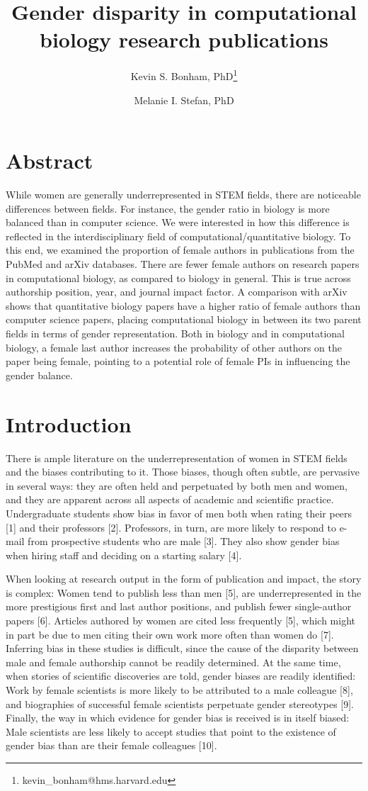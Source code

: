 \documentclass[11pt]{article}
\title{Gender disparity in computational biology research publications}
\author[1][2]{Kevin S. Bonham, PhD\thanks{kevin_bonham@hms.harvard.edu}}
\author[3]{Melanie I. Stefan, PhD}
\affil[1]Microbiology and Immunobiology, Harvard Medical School. Boston, MA, USA
\affil[2]Curriculum Fellows Program and Educational Laboratory, Harvard Medical School. Boston, MA, USA
\affil[3]Centre for Integrative Physiology, Edinburgh Medical School: Biomedical Sciences, University of Edinburgh. Edinburgh, United Kingdom
\begin{document}
\section{Abstract}
While women are generally underrepresented in STEM fields, there are noticeable differences between fields. For instance, the gender ratio in biology is more balanced than in computer science. We were interested in how this difference is reflected in the interdisciplinary field of computational/quantitative biology. To this end, we examined the proportion of female authors in publications from the PubMed and arXiv databases. There are fewer female authors on research papers in computational biology, as compared to biology in general. This is true across authorship position, year, and journal impact factor. A comparison with arXiv shows that quantitative biology papers have a higher ratio of female authors than computer science papers, placing computational biology in between its two parent fields in terms of gender representation. Both in biology and in computational biology, a female last author increases the probability of other authors on the paper being female, pointing to a potential role of female PIs in influencing the gender balance.

\section{Introduction}
There is ample literature on the underrepresentation of women in STEM fields and the biases contributing to it. Those biases, though often subtle, are pervasive in several ways: they are often held and perpetuated by both men and women, and they are apparent across all aspects of academic and scientific practice. Undergraduate students show bias in favor of men both when rating their peers [1] and their professors [2]. Professors, in turn, are more likely to respond to e-mail from prospective students who are male [3]. They also show gender bias when hiring staff and deciding on a starting salary [4].

When looking at research output in the form of publication and impact, the story is complex: Women tend to publish less than men [5], are underrepresented in the more prestigious first and last author positions, and publish fewer single-author papers [6]. Articles authored by women are cited less frequently [5], which might in part be due to men citing their own work more often than women do [7]. Inferring bias in these studies is difficult, since the cause of the disparity between male and female authorship cannot be readily determined. At the same time, when stories of scientific discoveries are told, gender biases are readily identified: Work by female scientists is more likely to be attributed to a male colleague [8], and biographies of successful female scientists perpetuate gender stereotypes [9]. Finally, the way in which evidence for gender bias is received is in itself biased:  Male scientists are less likely to accept studies that point to the existence of gender bias than are their female colleagues [10].
\end{document}

